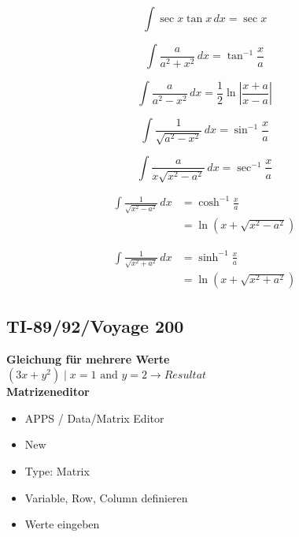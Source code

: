 \documentclass[a4paper, 10pt]{scrartcl}
\newcommand{\dx}{\hspace{2pt}dx}
\begin{document}
\begin{center}
\begin{multicols}{2}
		\begin{equation}
			\int \sec x \tan x \dx = \sec x
		\end{equation}
		
		\begin{equation}
			\int \frac{a}{a^2+x^2}\dx = \tan^{-1}\frac{x}{a}
		\end{equation}
		
		\begin{equation}
			\int \frac{a}{a^2-x^2}\dx = \frac{1}{2}\ln\left|\frac{x+a}{x-a}\right|
		\end{equation}
		
		\begin{equation}
			\int \frac{1}{\sqrt{a^2-x^2}} \dx = \sin^{-1} \frac{x}{a}
		\end{equation}
		
		\begin{equation}
			\int \frac{a}{x \sqrt{x^2-a^2}} \dx = \sec^{-1} \frac{x}{a}
		\end{equation}
		
		\begin{align}
			\int \frac{1}{\sqrt{x^2-a^2}} \dx &= \cosh^{-1} \frac{x}{a} \\&= \nonumber \ln (x+\sqrt{x^2-a^2})
		\end{align}
		
		\begin{align}
			\int \frac{1}{\sqrt{x^2+a^2}} \dx &= \sinh^{-1} \frac{x}{a} \\&=\nonumber \ln (x+\sqrt{x^2+a^2})
		\end{align}
		
	\end{multicols}
\end{center}		



\subsection{TI-89/92/Voyage 200}
\textbf{Gleichung für mehrere Werte}\\
$(3x+y^2) \mid x=1 \text{ and } y=2 \to Resultat$\\
\textbf{Matrizeneditor}
\begin{itemize}
	\item APPS / Data/Matrix Editor
	\item New
	\item Type: Matrix
	\item Variable, Row, Column definieren
	\item Werte eingeben
\end{itemize}
\end{document}
